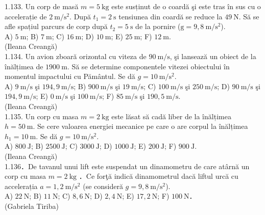 1.133. Un corp de masă $m=5 \mathrm{~kg}$ este susținut de o coardă şi este tras în sus cu o accelerație de $2 \mathrm{~m} / \mathrm{s}^{2}$. După $t_{1}=2 \mathrm{~s}$ tensiunea din coardă se reduce la $49 \mathrm{~N}$. Să se afle spațiul parcurs de corp după $t_{2}=5 \mathrm{~s}$ de la pornire ($\mathrm{g}=9,8 \mathrm{~m} / \mathrm{s}^{2}$).\\ A) $5 \mathrm{~m}$; B) $7 \mathrm{~m}$; C) $16 \mathrm{~m}$; D) $10 \mathrm{~m}$; E) $25 \mathrm{~m}$; F) $12 \mathrm{~m}$.\\ (Ileana Creangă)\\

1.134. Un avion zboară orizontal cu viteza de $90 \mathrm{~m} / \mathrm{s}$, şi lansează un obiect de la înălțimea de $1900 \mathrm{~m}$. Să se determine componentele vitezei obiectului în momentul impactului cu Pământul. Se dă $g=10 \mathrm{~m} / \mathrm{s}^{2}$.\\ A) $9 \mathrm{~m} / \mathrm{s}$ şi $194,9 \mathrm{~m} / \mathrm{s}$; B) $900 \mathrm{~m} / \mathrm{s}$ şi $19 \mathrm{~m} / \mathrm{s}$; C) $100 \mathrm{~m} / \mathrm{s}$ şi $250 \mathrm{~m} / \mathrm{s}$; D) $90 \mathrm{~m} / \mathrm{s}$ şi $194,9 \mathrm{~m} / \mathrm{s}$; E) $0 \mathrm{~m} / \mathrm{s}$ şi $100 \mathrm{~m} / \mathrm{s}$; F) $85 \mathrm{~m} / \mathrm{s}$ şi $190,5 \mathrm{~m} / \mathrm{s}$.\\ (Ileana Creangă)\\

1.135. Un corp cu masa $m=2 \mathrm{~kg}$ este lăsat să cadă liber de la înălțimea $h=50 \mathrm{~m}$. Se cere valoarea energiei mecanice pe care o are corpul la înălțimea $h_{1}=10 \mathrm{~m}$. Se dă $g=10 \mathrm{~m} / \mathrm{s}^{2}$.\\ A) $800 \mathrm{~J}$; B) $2500 \mathrm{~J}$; C) $3000 \mathrm{~J}$; D) $1000 \mathrm{~J}$; E) $200 \mathrm{~J}$; F) $900 \mathrm{~J}$.\\ (Ileana Creangă)\\

1.136．De tavanul unui lift este suspendat un dinamometru de care atârnă un corp cu masa $m=2 \mathrm{~kg}$ ．Ce forţă indică dinamometrul dacă liftul urcă cu accelerația $a=1,2 \mathrm{~m} / \mathrm{s}^{2}$ (se consideră $g=9,8 \mathrm{~m} / \mathrm{s}^{2}$).\\ A) $22 \mathrm{~N}$; B) $11 \mathrm{~N}$; C) $8,6 \mathrm{~N}$; D) $2,4 \mathrm{~N}$; E) $17,2 \mathrm{~N}$; F) $100 \mathrm{~N}$．\\ (Gabriela Tiriba)\\

